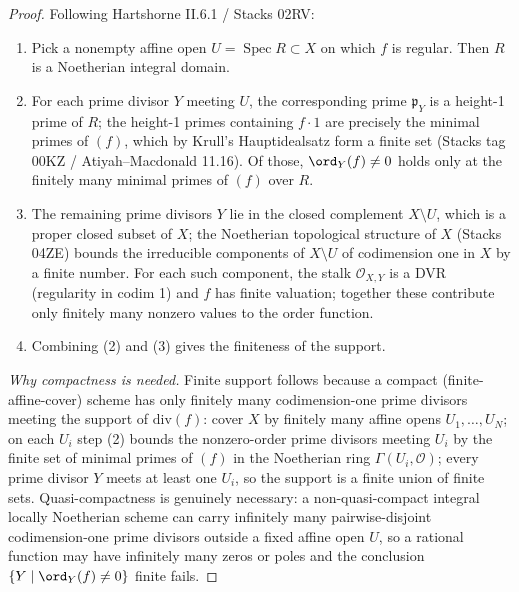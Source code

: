 \begin{proof}
  Following Hartshorne II.6.1 / Stacks 02RV:
  \begin{enumerate}
  \item Pick a nonempty affine open \(U = \operatorname{Spec} R \subset X\) on
    which \(f\) is regular. Then \(R\) is a Noetherian integral domain.
  \item For each prime divisor \(Y\) meeting \(U\), the corresponding
    prime \(\mathfrak p_Y\) is a height-1 prime of \(R\); the height-1 primes
    containing \(f \cdot 1\) are precisely the minimal primes of
    \((f)\), which by Krull's Hauptidealsatz form a finite set (Stacks tag
    00KZ / Atiyah--Macdonald 11.16). Of those, \(\ord_Y(f) \ne 0\) holds
    only at the finitely many minimal primes of \((f)\) over \(R\).
  \item The remaining prime divisors \(Y\) lie in the closed complement
    \(X \setminus U\), which is a proper closed subset of \(X\); the
    Noetherian topological structure of \(X\) (Stacks 04ZE) bounds the
    irreducible components of \(X \setminus U\) of codimension one in
    \(X\) by a finite number. For each such component, the stalk
    \(\mathcal O_{X, Y}\) is a DVR (regularity in codim 1) and \(f\) has
    finite valuation; together these contribute only finitely many
    nonzero values to the order function.
  \item Combining (2) and (3) gives the finiteness of the support.
  \end{enumerate}
  \emph{Why compactness is needed.} Finite support follows because a
  compact (finite-affine-cover) scheme has only finitely many codimension-one
  prime divisors meeting the support of \(\mathrm{div}(f)\): cover \(X\) by
  finitely many affine opens \(U_1, \dots, U_N\); on each \(U_i\) step (2)
  bounds the nonzero-order prime divisors meeting \(U_i\) by the finite set of
  minimal primes of \((f)\) in the Noetherian ring \(\Gamma(U_i, \mathcal O)\);
  every prime divisor \(Y\) meets at least one \(U_i\), so the support is a
  finite union of finite sets. Quasi-compactness is genuinely necessary: a
  non-quasi-compact integral locally Noetherian scheme can carry infinitely
  many pairwise-disjoint codimension-one prime divisors outside a fixed affine
  open \(U\), so a rational function may have infinitely many zeros or poles
  and the conclusion \(\{Y \mid \ord_Y(f) \ne 0\}\) finite fails.
\end{proof}

